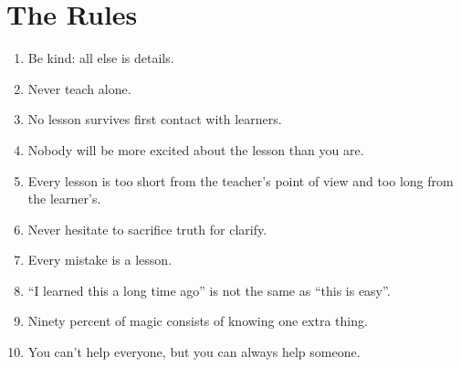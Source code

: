 \chapter*{The Rules}

\begin{enumerate}

\item
  Be kind: all else is details.

\item
  Never teach alone.

\item
  No lesson survives first contact with learners.

\item
  Nobody will be more excited about the lesson than you are.

\item
  Every lesson is too short from the teacher's point of view and too
  long from the learner's.

\item
  Never hesitate to sacrifice truth for clarify.

\item
  Every mistake is a lesson.

\item
  ``I learned this a long time ago'' is not the same as ``this is
  easy''.

\item
  Ninety percent of magic consists of knowing one extra thing.

\item
  You can't help everyone, but you can always help someone.

\end{enumerate}
